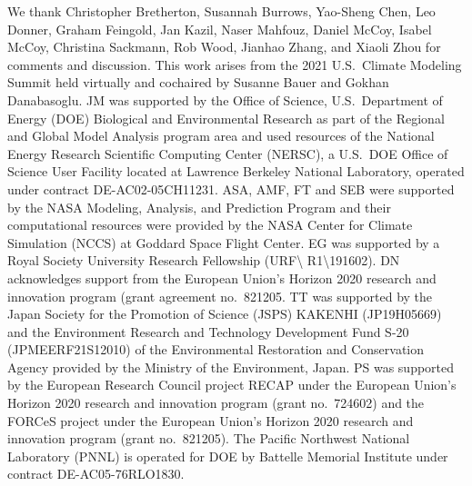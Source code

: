 \documentclass[acp, manuscript]{copernicus}\usepackage[]{graphicx}\usepackage[]{xcolor}
\begin{document}

\begin{acknowledgements}
  We thank Christopher Bretherton, Susannah Burrows, Yao-Sheng Chen, Leo Donner,
  Graham Feingold, Jan Kazil, Naser Mahfouz, 
  Daniel McCoy, Isabel McCoy, Christina Sackmann, Rob Wood, Jianhao Zhang, and
  Xiaoli Zhou for comments and discussion.  This work arises from the 2021
  U.S.~Climate Modeling Summit held virtually and cochaired by Susanne Bauer
  and Gokhan Danabasoglu.  JM was supported by the Office of Science,
  U.S.~Department of Energy (DOE) Biological and Environmental Research as part
  of the Regional and Global Model Analysis program area and used resources of the National Energy Research Scientific Computing Center (NERSC), a U.S.~DOE Office of Science User Facility located at Lawrence Berkeley National Laboratory, operated under contract DE-AC02-05CH11231.  ASA, AMF, FT and SEB
  were supported by the NASA Modeling, Analysis, and Prediction Program and
  their computational resources were provided by the NASA Center for Climate
  Simulation (NCCS) at Goddard Space Flight Center.  EG was supported by a Royal
  Society University Research Fellowship (URF\textbackslash
  R1\textbackslash191602).  DN acknowledges support from the European Union’s
  Horizon 2020 research and innovation program (grant agreement no.~821205. TT was supported by the Japan Society for the Promotion of Science (JSPS)
  KAKENHI (JP19H05669) and the Environment Research and Technology Development
  Fund S-20 (JPMEERF21S12010) of the Environmental Restoration and Conservation
  Agency provided by the Ministry of the Environment, Japan. PS was supported by
  the European Research Council project RECAP under the European Union’s Horizon
  2020 research and innovation program (grant no.~724602) and the FORCeS project
  under the European Union’s Horizon 2020 research and innovation program (grant 
  no.~821205). The Pacific Northwest National Laboratory (PNNL) is operated for
  DOE by Battelle Memorial Institute under contract DE-AC05-76RLO1830.
\end{acknowledgements}







\end{document}
